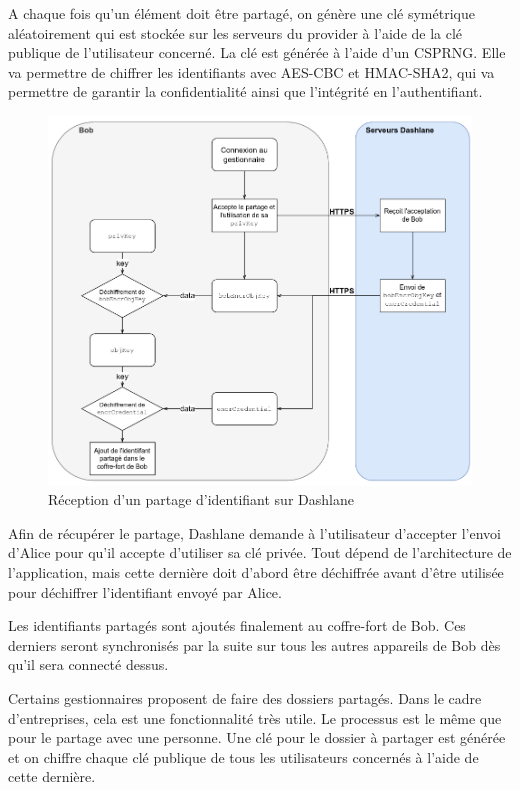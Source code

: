 A chaque fois qu'un élément doit être partagé, on génère une clé symétrique aléatoirement qui est stockée sur les serveurs du provider à l'aide de la clé publique de l'utilisateur concerné. La clé est générée à l'aide d'un CSPRNG. Elle va permettre de chiffrer les identifiants avec AES-CBC et HMAC-SHA2, qui va permettre de garantir la confidentialité ainsi que l'intégrité en l'authentifiant.
\begin{figure}[h!]
	\includegraphics[width=15.5cm]{images/dashlane_share_bob.png}
	\centering
	\caption{Réception d'un partage d'identifiant sur Dashlane}
\end{figure}

Afin de récupérer le partage, Dashlane demande à l'utilisateur d'accepter l'envoi d'Alice pour qu'il accepte d'utiliser sa clé privée. Tout dépend de l'architecture de l'application, mais cette dernière doit d'abord être déchiffrée avant d'être utilisée pour déchiffrer l'identifiant envoyé par Alice. 

Les identifiants partagés sont ajoutés finalement au coffre-fort de Bob. Ces derniers seront synchronisés par la suite sur tous les autres appareils de Bob dès qu'il sera connecté dessus. 

Certains gestionnaires proposent de faire des dossiers partagés. Dans le cadre d'entreprises, cela est une fonctionnalité très utile. Le processus est le même que pour le partage avec une personne. Une clé pour le dossier à partager est générée et on chiffre chaque clé publique de tous les utilisateurs concernés à l'aide de cette dernière.


